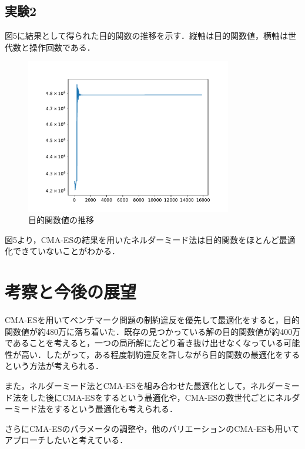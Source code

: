 \documentclass[twocolumn]{jarticle}
\begin{document}
	\subsection{実験2}
		図5に結果として得られた目的関数の推移を示す．縦軸は目的関数値，横軸は世代数と操作回数である．
		\begin{figure}
			\centering
            \includegraphics[width=9cm]{cmaes_nelder2.pdf}
            \caption{目的関数値の推移}
        \end{figure}
		図5より，CMA-ESの結果を用いたネルダーミード法は目的関数をほとんど最適化できていないことがわかる．
\section{考察と今後の展望}
	CMA-ESを用いてベンチマーク問題の制約違反を優先して最適化をすると，目的関数値が約480万に落ち着いた．既存の見つかっている解の目的関数値が約400万であることを考えると，一つの局所解にたどり着き抜け出せなくなっている可能性が高い．したがって，ある程度制約違反を許しながら目的関数の最適化をするという方法が考えられる．
	
	また，ネルダーミード法とCMA-ESを組み合わせた最適化として，ネルダーミード法をした後にCMA-ESをするという最適化や，CMA-ESの数世代ごとにネルダーミード法をするという最適化も考えられる．

	さらにCMA-ESのパラメータの調整や，他のバリエーションのCMA-ESも用いてアプローチしたいと考えている．

\end{document}
